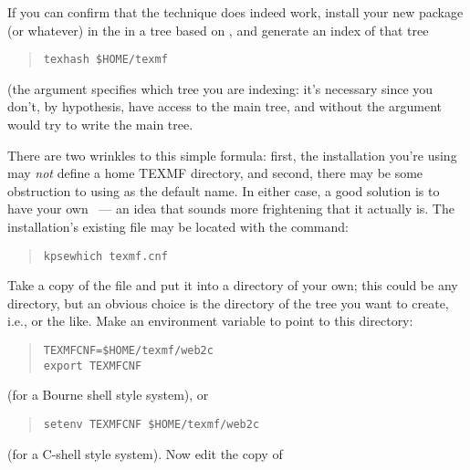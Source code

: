 If you can confirm that the technique does indeed work, install your
new package (or whatever) in the 
in a tree based on , %
and generate an index of that tree
\begin{quote}
\begin{verbatim}
texhash $HOME/texmf
\end{verbatim}
\end{quote}
(the argument specifies which tree you are indexing: it's necessary
since you don't, by hypothesis, have access to the main tree, and
 without the argument would try to write the main
tree.

There are two wrinkles to this simple formula: first, the installation
you're using may \emph{not} define a home TEXMF directory, and second,
there may be some obstruction to using  %
as the
default name.  In either case, a good solution is to have your own
~--- an idea that sounds more frightening that it
actually is.  The installation's existing file may be located with the
command:
\begin{quote}
\begin{verbatim}
kpsewhich texmf.cnf
\end{verbatim}
\end{quote}
Take a copy of the file and put it into a directory of your own; this
could be any directory, but an obvious choice is the 
directory of the tree you want to create, i.e.,
or the like.  Make an environment variable to
point to this directory:
\begin{quote}
\begin{verbatim}
TEXMFCNF=$HOME/texmf/web2c
export TEXMFCNF
\end{verbatim}
\end{quote}
(for a Bourne shell style system), or
\begin{quote}
\begin{verbatim}
setenv TEXMFCNF $HOME/texmf/web2c
\end{verbatim}
\end{quote}
(for a C-shell style system).  Now edit the copy of 

